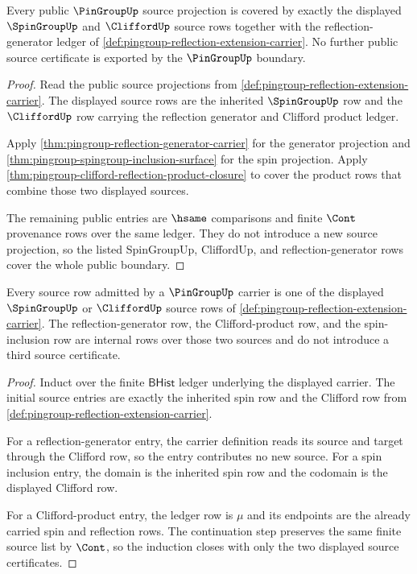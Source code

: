 \begin{theorem}
\label{thm:pingroup-source-ledger-coverage}
Every public $\PinGroupUp$ source projection is covered by exactly the
displayed $\SpinGroupUp$ and $\CliffordUp$ source rows together with the
reflection-generator ledger of
\autoref{def:pingroup-reflection-extension-carrier}.  No further public
source certificate is exported by the $\PinGroupUp$ boundary.
\end{theorem}
\begin{proof}
Read the public source projections from
\autoref{def:pingroup-reflection-extension-carrier}.  The displayed source
rows are the inherited $\SpinGroupUp$ row and the $\CliffordUp$ row carrying
the reflection generator and Clifford product ledger.

Apply \autoref{thm:pingroup-reflection-generator-carrier} for the generator
projection and \autoref{thm:pingroup-spingroup-inclusion-surface} for the
spin projection.  Apply
\autoref{thm:pingroup-clifford-reflection-product-closure} to cover the
product rows that combine those two displayed sources.

The remaining public entries are $\hsame$ comparisons and finite $\Cont$
provenance rows over the same ledger.  They do not introduce a new source
projection, so the listed SpinGroupUp, CliffordUp, and reflection-generator
rows cover the whole public boundary.
\end{proof}

\begin{theorem}
\label{thm:pingroup-spin-clifford-source-scope}
Every source row admitted by a $\PinGroupUp$ carrier is one of the displayed
$\SpinGroupUp$ or $\CliffordUp$ source rows of
\autoref{def:pingroup-reflection-extension-carrier}. The reflection-generator
row, the Clifford-product row, and the spin-inclusion row are internal rows
over those two sources and do not introduce a third source certificate.
\end{theorem}
\begin{proof}
Induct over the finite $\mathsf{BHist}$ ledger underlying the displayed
carrier. The initial source entries are exactly the inherited spin row and the
Clifford row from \autoref{def:pingroup-reflection-extension-carrier}.

For a reflection-generator entry, the carrier definition reads its source and
target through the Clifford row, so the entry contributes no new source. For a
spin inclusion entry, the domain is the inherited spin row and the codomain is
the displayed Clifford row.

For a Clifford-product entry, the ledger row is $\mu$ and its endpoints are the
already carried spin and reflection rows. The continuation step preserves the
same finite source list by $\Cont$, so the induction closes with only the two
displayed source certificates.
\end{proof}

